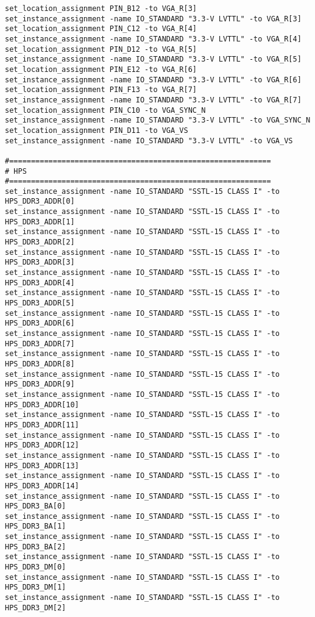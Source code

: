 \begin{verbatim}
set_location_assignment PIN_B12 -to VGA_R[3]
set_instance_assignment -name IO_STANDARD "3.3-V LVTTL" -to VGA_R[3]
set_location_assignment PIN_C12 -to VGA_R[4]
set_instance_assignment -name IO_STANDARD "3.3-V LVTTL" -to VGA_R[4]
set_location_assignment PIN_D12 -to VGA_R[5]
set_instance_assignment -name IO_STANDARD "3.3-V LVTTL" -to VGA_R[5]
set_location_assignment PIN_E12 -to VGA_R[6]
set_instance_assignment -name IO_STANDARD "3.3-V LVTTL" -to VGA_R[6]
set_location_assignment PIN_F13 -to VGA_R[7]
set_instance_assignment -name IO_STANDARD "3.3-V LVTTL" -to VGA_R[7]
set_location_assignment PIN_C10 -to VGA_SYNC_N
set_instance_assignment -name IO_STANDARD "3.3-V LVTTL" -to VGA_SYNC_N
set_location_assignment PIN_D11 -to VGA_VS
set_instance_assignment -name IO_STANDARD "3.3-V LVTTL" -to VGA_VS

#============================================================
# HPS
#============================================================
set_instance_assignment -name IO_STANDARD "SSTL-15 CLASS I" -to HPS_DDR3_ADDR[0]
set_instance_assignment -name IO_STANDARD "SSTL-15 CLASS I" -to HPS_DDR3_ADDR[1]
set_instance_assignment -name IO_STANDARD "SSTL-15 CLASS I" -to HPS_DDR3_ADDR[2]
set_instance_assignment -name IO_STANDARD "SSTL-15 CLASS I" -to HPS_DDR3_ADDR[3]
set_instance_assignment -name IO_STANDARD "SSTL-15 CLASS I" -to HPS_DDR3_ADDR[4]
set_instance_assignment -name IO_STANDARD "SSTL-15 CLASS I" -to HPS_DDR3_ADDR[5]
set_instance_assignment -name IO_STANDARD "SSTL-15 CLASS I" -to HPS_DDR3_ADDR[6]
set_instance_assignment -name IO_STANDARD "SSTL-15 CLASS I" -to HPS_DDR3_ADDR[7]
set_instance_assignment -name IO_STANDARD "SSTL-15 CLASS I" -to HPS_DDR3_ADDR[8]
set_instance_assignment -name IO_STANDARD "SSTL-15 CLASS I" -to HPS_DDR3_ADDR[9]
set_instance_assignment -name IO_STANDARD "SSTL-15 CLASS I" -to HPS_DDR3_ADDR[10]
set_instance_assignment -name IO_STANDARD "SSTL-15 CLASS I" -to HPS_DDR3_ADDR[11]
set_instance_assignment -name IO_STANDARD "SSTL-15 CLASS I" -to HPS_DDR3_ADDR[12]
set_instance_assignment -name IO_STANDARD "SSTL-15 CLASS I" -to HPS_DDR3_ADDR[13]
set_instance_assignment -name IO_STANDARD "SSTL-15 CLASS I" -to HPS_DDR3_ADDR[14]
set_instance_assignment -name IO_STANDARD "SSTL-15 CLASS I" -to HPS_DDR3_BA[0]
set_instance_assignment -name IO_STANDARD "SSTL-15 CLASS I" -to HPS_DDR3_BA[1]
set_instance_assignment -name IO_STANDARD "SSTL-15 CLASS I" -to HPS_DDR3_BA[2]
set_instance_assignment -name IO_STANDARD "SSTL-15 CLASS I" -to HPS_DDR3_DM[0]
set_instance_assignment -name IO_STANDARD "SSTL-15 CLASS I" -to HPS_DDR3_DM[1]
set_instance_assignment -name IO_STANDARD "SSTL-15 CLASS I" -to HPS_DDR3_DM[2]

\end{verbatim}
